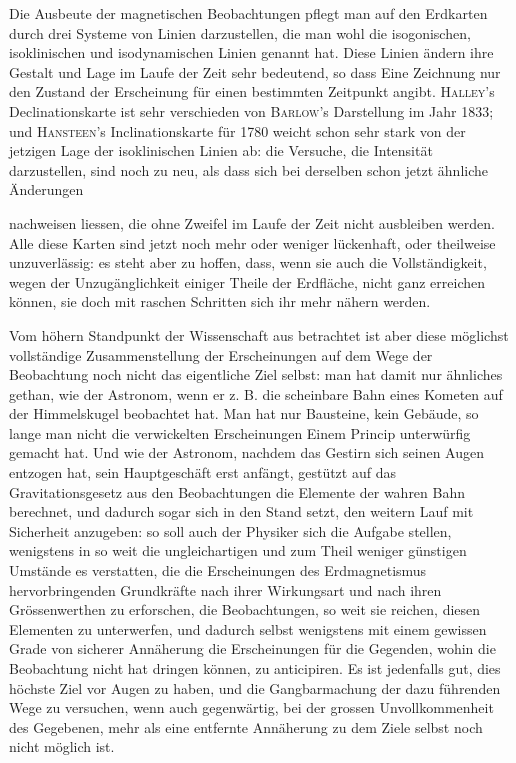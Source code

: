 Die Ausbeute der magnetischen Beobachtungen pflegt man auf den Erdkarten durch drei Systeme von Linien darzustellen, die man wohl die isogonischen, isoklinischen und isodynamischen Linien genannt hat. Diese Linien ändern ihre Gestalt und Lage im Laufe der Zeit sehr bedeutend, so dass Eine Zeichnung nur den Zustand der Erscheinung für einen bestimmten Zeitpunkt angibt. \textsc{Halley}'s Declinationskarte ist sehr verschieden von \textsc{Barlow}'s Darstellung im Jahr 1833; und \textsc{Hansteen}'s Inclinationskarte für 1780 weicht schon sehr stark von der jetzigen Lage der isoklinischen Linien ab: die Versuche, die Intensität darzustellen, sind noch zu neu, als dass sich bei derselben schon jetzt ähnliche Änderungen \par
\clearpage
{}
\noindent nachweisen liessen, die ohne Zweifel im Laufe der Zeit nicht ausbleiben werden. Alle diese Karten sind jetzt noch mehr oder weniger lückenhaft, oder theilweise unzuverlässig: es steht aber zu hoffen, dass, wenn sie auch die Vollständigkeit, wegen der Unzugänglichkeit einiger Theile der Erdfläche, nicht ganz erreichen können, sie doch mit raschen Schritten sich ihr mehr nähern werden.

Vom höhern Standpunkt der Wissenschaft aus betrachtet ist aber diese möglichst vollständige Zusammenstellung der Erscheinungen auf dem Wege der Beobachtung noch nicht das eigentliche Ziel selbst: man hat damit nur ähnliches gethan, wie der Astronom, wenn er z. B. die scheinbare Bahn eines Kometen auf der Himmelskugel beobachtet hat. Man hat nur Bausteine, kein Gebäude, so lange man nicht die verwickelten Erscheinungen Einem Princip unterwürfig gemacht hat. Und wie der Astronom, nachdem das Gestirn sich seinen Augen entzogen hat, sein Hauptgeschäft erst anfängt, gestützt auf das Gravitationsgesetz aus den Beobachtungen die Elemente der wahren Bahn berechnet, und dadurch sogar sich in den Stand setzt, den weitern Lauf mit Sicherheit anzugeben: so soll auch der Physiker sich die Aufgabe stellen, wenigstens in so weit die ungleichartigen und zum Theil weniger günstigen Umstände es verstatten, die die Erscheinungen des Erdmagnetismus hervorbringenden Grundkräfte nach ihrer Wirkungsart und nach ihren Grössenwerthen zu erforschen, die Beobachtungen, so weit sie reichen, diesen Elementen zu unterwerfen, und dadurch selbst wenigstens mit einem gewissen Grade von sicherer Annäherung die Erscheinungen für die Gegenden, wohin die Beobachtung nicht hat dringen können, zu anticipiren. Es ist jedenfalls gut, dies höchste Ziel vor Augen zu haben, und die Gangbarmachung der dazu führenden Wege zu versuchen, wenn auch gegenwärtig, bei der grossen Unvollkommenheit des Gegebenen, mehr als eine entfernte Annäherung zu dem Ziele selbst noch nicht möglich ist.


